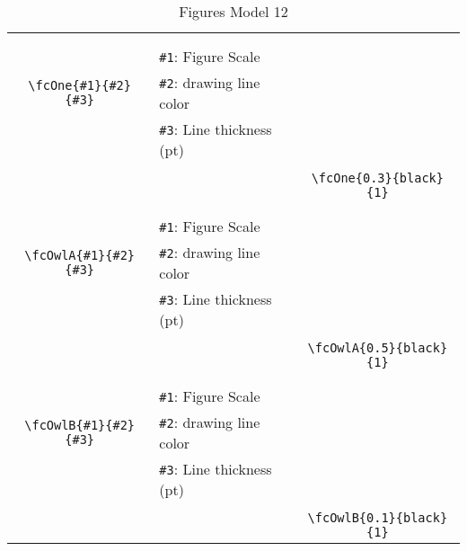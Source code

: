 \documentclass[x11names]{article}
\begin{document}
\begin{table}[H]
\begin{tabular}{|c|l|c|}
	&&\multirow{5}{*}{\fcOne{0.3}{black}{1}}\\	&&\\	&\verb|#1|: Figure Scale &\\	\verb|\fcOne{#1}{#2}{#3}|&	\verb|#2|: drawing line color &\\	&\verb|#3|: Line thickness (pt) &\\ &&\\&&	\verb|\fcOne{0.3}{black}{1}|\\\hline 	
	&&\multirow{5}{*}{\fcOwlA{0.5}{black}{1}}\\	&&\\	&\verb|#1|: Figure Scale &\\	\verb|\fcOwlA{#1}{#2}{#3}|&	\verb|#2|: drawing line color &\\	&\verb|#3|: Line thickness (pt) &\\ &&\\&&	\verb|\fcOwlA{0.5}{black}{1}|\\\hline 	
	&&\multirow{5}{*}{\fcOwlB{0.1}{black}{1}}\\	&&\\	&\verb|#1|: Figure Scale &\\	\verb|\fcOwlB{#1}{#2}{#3}|&	\verb|#2|: drawing line color &\\	&\verb|#3|: Line thickness (pt) &\\ &&\\&&	\verb|\fcOwlB{0.1}{black}{1}|\\\hline 	\hline\end{tabular}\caption{Figures Model 12}\label{tab12}\end{table}
\end{document}
